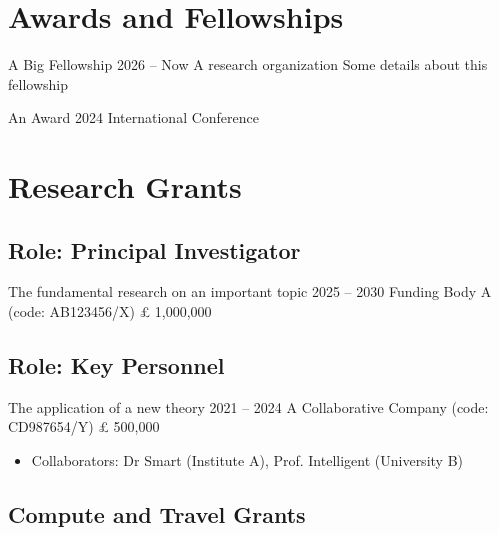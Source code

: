 \documentclass[a4paper,11pt]{article}
\begin{document}

\section{Awards and Fellowships}


\award
	{A Big Fellowship}
	{2026 -- Now}
	{A research organization}
	{Some details about this fellowship}

\award
	{An Award}
	{2024}
	{International Conference}{}


\section{Research Grants}

\subsection{Role: Principal Investigator}


\grant
	{The fundamental research on an important topic}
	{2025 -- 2030}
	{Funding Body A (code: AB123456/X)}
	{£ 1,000,000}{}

\subsection{Role: Key Personnel}

\grant
	{The application of a new theory}
	{2021 -- 2024}
	{A Collaborative Company (code: CD987654/Y)}
	{£ 500,000}{
		\begin{itemize}
			\item[-] Collaborators: Dr Smart (Institute A), Prof. Intelligent (University B)
		\end{itemize}
	}

\subsection{Compute and Travel Grants}
\end{document}
